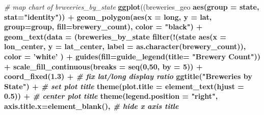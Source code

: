 \documentclass[]{article}
\newenvironment{Shaded}{\begin{snugshade}}{\end{snugshade}}
\newcommand{\KeywordTok}[1]{\textcolor[rgb]{0.13,0.29,0.53}{\textbf{#1}}}
\newcommand{\DataTypeTok}[1]{\textcolor[rgb]{0.13,0.29,0.53}{#1}}
\newcommand{\DecValTok}[1]{\textcolor[rgb]{0.00,0.00,0.81}{#1}}
\newcommand{\FloatTok}[1]{\textcolor[rgb]{0.00,0.00,0.81}{#1}}
\newcommand{\StringTok}[1]{\textcolor[rgb]{0.31,0.60,0.02}{#1}}
\newcommand{\CommentTok}[1]{\textcolor[rgb]{0.56,0.35,0.01}{\textit{#1}}}
\newcommand{\OperatorTok}[1]{\textcolor[rgb]{0.81,0.36,0.00}{\textbf{#1}}}
\newcommand{\NormalTok}[1]{#1}
\begin{document}
\begin{Shaded}
\begin{Highlighting}[]
{\CommentTok{# map chart of brweeries_by_state}
\KeywordTok{ggplot}\NormalTok{((breweries_geo }\OperatorTok{%
       \KeywordTok{aes}\NormalTok{(}\DataTypeTok{group =}\NormalTok{ state, }\DataTypeTok{stat=}\StringTok{"identity"}\NormalTok{)) }\OperatorTok{+}
\StringTok{  }\KeywordTok{geom_polygon}\NormalTok{(}\KeywordTok{aes}\NormalTok{(}\DataTypeTok{x =}\NormalTok{ long, }
                   \DataTypeTok{y =}\NormalTok{ lat, }
                   \DataTypeTok{group=}\NormalTok{group, }
                   \DataTypeTok{fill=}\NormalTok{brewery_count), }
               \DataTypeTok{color =} \StringTok{"black"}\NormalTok{) }\OperatorTok{+}\StringTok{ }
\StringTok{  }\KeywordTok{geom_text}\NormalTok{(}\DataTypeTok{data =}\NormalTok{ (breweries_by_state }\OperatorTok{%
\StringTok{                    }\KeywordTok{filter}\NormalTok{(}\OperatorTok{!}\NormalTok{(state }\OperatorTok{%
            \KeywordTok{aes}\NormalTok{(}\DataTypeTok{x =}\NormalTok{ lon_center, }
                \DataTypeTok{y =}\NormalTok{ lat_center, }
                \DataTypeTok{label =} \KeywordTok{as.character}\NormalTok{(brewery_count)),}
            \DataTypeTok{color =} \StringTok{'white'}
\NormalTok{            ) }\OperatorTok{+}
\StringTok{  }\KeywordTok{guides}\NormalTok{(}\DataTypeTok{fill=}\KeywordTok{guide_legend}\NormalTok{(}\DataTypeTok{title=} \StringTok{"Brewery Count"}\NormalTok{)) }\OperatorTok{+}
\StringTok{  }\KeywordTok{scale_fill_continuous}\NormalTok{(}\DataTypeTok{breaks =} \KeywordTok{seq}\NormalTok{(}\DecValTok{0}\NormalTok{,}\DecValTok{50}\NormalTok{, }\DataTypeTok{by =} \DecValTok{5}\NormalTok{)) }\OperatorTok{+}
\StringTok{  }\KeywordTok{coord_fixed}\NormalTok{(}\FloatTok{1.3}\NormalTok{) }\OperatorTok{+}\StringTok{ }\CommentTok{# fix lat/long display ratio}
\StringTok{  }
\StringTok{  }\KeywordTok{ggtitle}\NormalTok{(}\StringTok{"Breweries by State"}\NormalTok{) }\OperatorTok{+}\StringTok{ }\CommentTok{# set plot title}
\StringTok{  }\KeywordTok{theme}\NormalTok{(}\DataTypeTok{plot.title =} \KeywordTok{element_text}\NormalTok{(}\DataTypeTok{hjust =} \FloatTok{0.5}\NormalTok{)) }\OperatorTok{+}\StringTok{ }\CommentTok{# center plot title}
\StringTok{  }\KeywordTok{theme}\NormalTok{(}\DataTypeTok{legend.position =} \StringTok{"right"}\NormalTok{,}
        \DataTypeTok{axis.title.x=}\KeywordTok{element_blank}\NormalTok{(), }\CommentTok{# hide x axis title}
}}}}
\end{Highlighting}
\end{Shaded}
\end{document}
